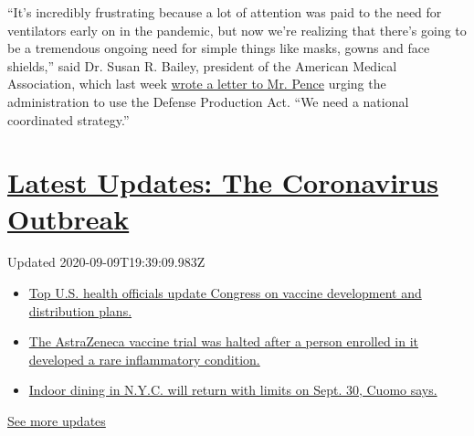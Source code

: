 ``It's incredibly frustrating because a lot of attention was paid to the
need for ventilators early on in the pandemic, but now we're realizing
that there's going to be a tremendous ongoing need for simple things
like masks, gowns and face shields,'' said Dr. Susan R. Bailey,
president of the American Medical Association, which last week
\href{https://searchlf.ama-assn.org/undefined/documentDownload?uri=\%2Funstructured\%2Fbinary\%2Fletter\%2FLETTERS\%2F2020-6-30-Letter-to-Pence-re-PPE.pdf}{wrote
a letter to Mr. Pence} urging the administration to use the Defense
Production Act. ``We need a national coordinated strategy.''

\hypertarget{latest-updates-the-coronavirus-outbreak}{%
\section{\texorpdfstring{\href{https://www.nytimes3xbfgragh.onion/2020/09/09/world/covid-coronavirus.html?action=click\&pgtype=Article\&state=default\&region=MAIN_CONTENT_1\&context=storylines_live_updates}{Latest
Updates: The Coronavirus
Outbreak}}{Latest Updates: The Coronavirus Outbreak}}\label{latest-updates-the-coronavirus-outbreak}}

Updated 2020-09-09T19:39:09.983Z

\begin{itemize}
\tightlist
\item
  \href{https://www.nytimes3xbfgragh.onion/2020/09/09/world/covid-coronavirus.html?action=click\&pgtype=Article\&state=default\&region=MAIN_CONTENT_1\&context=storylines_live_updates\#link-279e24e2}{Top
  U.S. health officials update Congress on vaccine development and
  distribution plans.}
\item
  \href{https://www.nytimes3xbfgragh.onion/2020/09/09/world/covid-coronavirus.html?action=click\&pgtype=Article\&state=default\&region=MAIN_CONTENT_1\&context=storylines_live_updates\#link-38cb0bfc}{The
  AstraZeneca vaccine trial was halted after a person enrolled in it
  developed a rare inflammatory condition.}
\item
  \href{https://www.nytimes3xbfgragh.onion/2020/09/09/world/covid-coronavirus.html?action=click\&pgtype=Article\&state=default\&region=MAIN_CONTENT_1\&context=storylines_live_updates\#link-792ae257}{Indoor
  dining in N.Y.C. will return with limits on Sept. 30, Cuomo says.}
\end{itemize}

\href{https://www.nytimes3xbfgragh.onion/2020/09/09/world/covid-coronavirus.html?action=click\&pgtype=Article\&state=default\&region=MAIN_CONTENT_1\&context=storylines_live_updates}{See
more updates}

